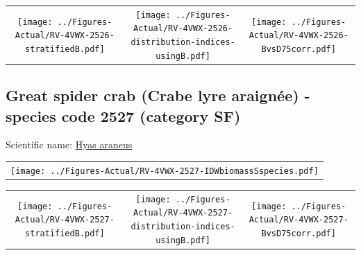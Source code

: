 \documentclass[12pt]{article}\usepackage[]{graphicx}\usepackage[]{color}
\begin{document}
\vspace{1cm}
\begin{minipage}{1.0\textwidth}
 \begin{tabular}{ccc}
\texttt{[image: ../Figures-Actual/RV-4VWX-2526-stratifiedB.pdf]} & 
\texttt{[image: ../Figures-Actual/RV-4VWX-2526-distribution-indices-usingB.pdf]} & 
\texttt{[image: ../Figures-Actual/RV-4VWX-2526-BvsD75corr.pdf]} \\ 
\end{tabular} 
\end{minipage}
\clearpage

\renewcommand\thefigure{\thesubsection\Alph{figure}}

\setcounter{figure}{0}

\hypertarget{sec:2527}{%
\subsection{Great spider crab (Crabe lyre araignée) - species code 2527 (category SF)}\label{sec:2527}}

  


Scientific name: \href{http://www.marinespecies.org/aphia.php?p=taxdetails\&id=107322}{Hyas araneus} \newline
\begin{minipage}{1.0\textwidth}
 \begin{tabular}{c}
\texttt{[image: ../Figures-Actual/RV-4VWX-2527-IDWbiomassSspecies.pdf]} \\ 
\end{tabular} 
\end{minipage}
\newline

\vspace{1cm}
\begin{minipage}{1.0\textwidth}
 \begin{tabular}{ccc}
\texttt{[image: ../Figures-Actual/RV-4VWX-2527-stratifiedB.pdf]} & 
\texttt{[image: ../Figures-Actual/RV-4VWX-2527-distribution-indices-usingB.pdf]} & 
\texttt{[image: ../Figures-Actual/RV-4VWX-2527-BvsD75corr.pdf]} \\ 
\end{tabular} 
\end{minipage}
\clearpage
\end{document}

